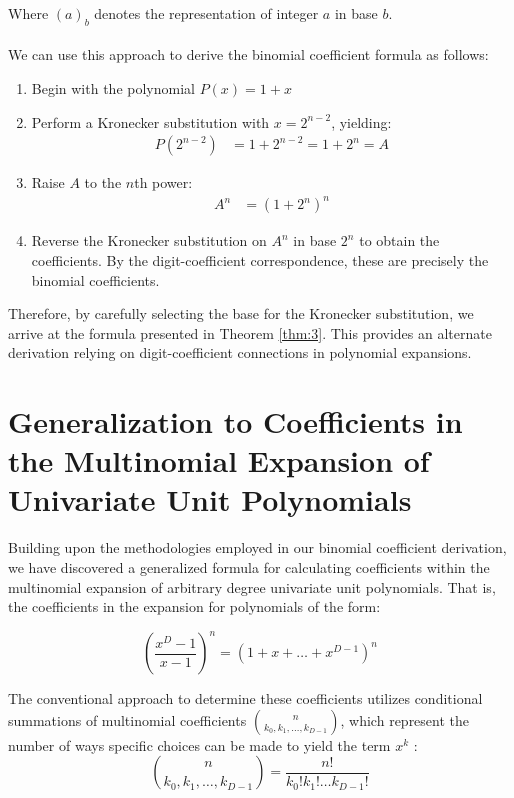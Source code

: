 \documentclass{article}
\theoremstyle{plain}
\theoremstyle{definition}
\begin{document}
Where $(a)_b$ denotes the representation of integer $a$ in base $b$.
\\
\\
We can use this approach to derive the binomial coefficient formula as follows:

\begin{enumerate}
\item Begin with the polynomial $P(x) = 1 + x$
\item Perform a Kronecker substitution with $x = 2^{n-2}$, yielding:
\begin{align}
P(2^{n-2}) &= 1 + 2^{n-2} = 1 + 2^n = A
\end{align}
\item Raise $A$ to the $n$th power:
\begin{align}
A^n &= (1 + 2^n)^n
\end{align}
\item Reverse the Kronecker substitution on $A^n$ in base $2^n$ to obtain the coefficients. By the digit-coefficient correspondence, these are precisely the binomial coefficients.
\end{enumerate}

Therefore, by carefully selecting the base for the Kronecker substitution, we arrive at the formula presented in Theorem \ref{thm:3}. This provides an alternate derivation relying on digit-coefficient connections in polynomial expansions.

\section{Generalization to Coefficients in the Multinomial Expansion of Univariate Unit Polynomials}
Building upon the methodologies employed in our binomial coefficient derivation, we have discovered a generalized formula for calculating coefficients within the multinomial expansion of arbitrary degree univariate unit polynomials. That is, the coefficients in the expansion for polynomials of the form:

\begin{equation}
\left(\frac{x^{D}-1}{x-1}\right)^n = (1 + x + \ldots + x^{D-1})^n 
\end{equation}

The conventional approach to determine these coefficients utilizes conditional summations of multinomial coefficients \(\binom{n}{k_0, k_1, \ldots, k_{D-1}}\), which represent the number of ways specific choices can be made to yield the term \(x^k\) \cite{graham1994concrete}:
\begin{equation}
\binom{n}{k_0, k_1, \ldots, k_{D-1}} = \frac{n!}{k_0! k_1! \ldots k_{D-1}!}
\end{equation}
\end{document}

